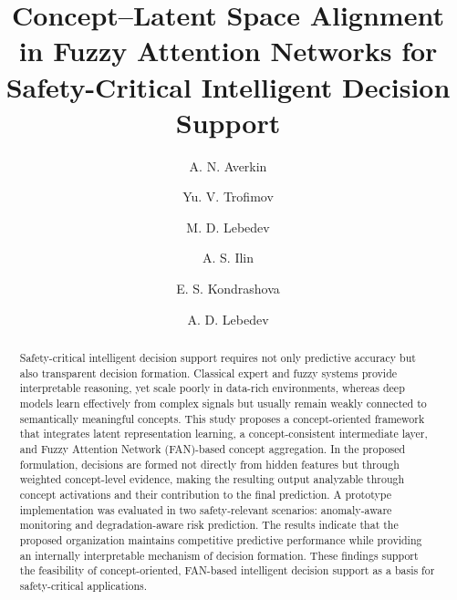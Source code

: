 \documentclass[runningheads]{llncs}
\begin{document}
\title{Concept--Latent Space Alignment in Fuzzy Attention Networks for Safety-Critical Intelligent Decision Support}


\author{
A. N. Averkin \and
Yu. V. Trofimov \and
M. D. Lebedev \and
A. S. Ilin \and
E. S. Kondrashova \and
A. D. Lebedev
}



\maketitle

\begin{abstract}
Safety-critical intelligent decision support requires not only predictive accuracy but also transparent decision formation. Classical expert and fuzzy systems provide interpretable reasoning, yet scale poorly in data-rich environments, whereas deep models learn effectively from complex signals but usually remain weakly connected to semantically meaningful concepts. This study proposes a concept-oriented framework that integrates latent representation learning, a concept-consistent intermediate layer, and Fuzzy Attention Network (FAN)-based concept aggregation. In the proposed formulation, decisions are formed not directly from hidden features but through weighted concept-level evidence, making the resulting output analyzable through concept activations and their contribution to the final prediction. A prototype implementation was evaluated in two safety-relevant scenarios: anomaly-aware monitoring and degradation-aware risk prediction. The results indicate that the proposed organization maintains competitive predictive performance while providing an internally interpretable mechanism of decision formation. These findings support the feasibility of concept-oriented, FAN-based intelligent decision support as a basis for safety-critical applications.

\end{abstract}
\end{document}
